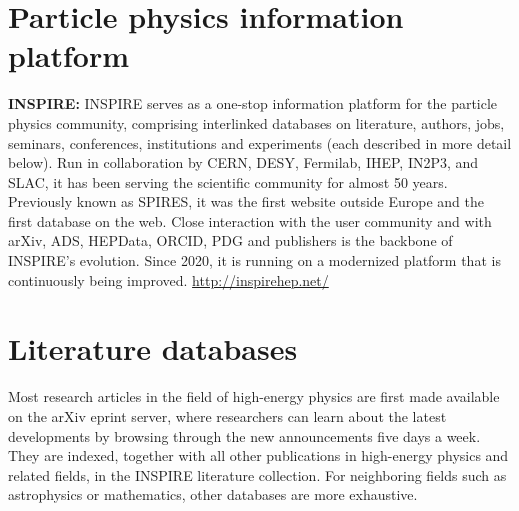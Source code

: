 \section{Particle physics information
platform}\label{databases:sec:platforms}


  \textbf{INSPIRE:} INSPIRE serves as a one-stop information platform
  for the particle physics community, comprising interlinked databases
  on literature, authors, jobs, seminars, conferences, institutions and
  experiments (each described in more detail below). Run in collaboration by CERN, DESY,
  Fermilab, IHEP, IN2P3, and SLAC, it has been serving the scientific
  community for almost 50 years. Previously known as SPIRES, it was the
  first website outside Europe and the first database on the web. Close
  interaction with the user community and with arXiv, ADS, HEPData,
  ORCID, PDG and publishers is the backbone of INSPIRE's evolution.
  Since 2020, it is running on a modernized platform that is continuously being improved.
  \url{http://inspirehep.net/}

\section{Literature databases}\label{databases:sec:literature}


Most research articles in the field of high-energy physics are first made
available on the arXiv eprint server, where researchers can learn about the
latest developments by browsing through the new announcements
five days a week. They are indexed, together with all other publications in
high-energy physics and related fields, in the INSPIRE literature collection.
For neighboring fields such as astrophysics or mathematics, other databases are
more exhaustive.

